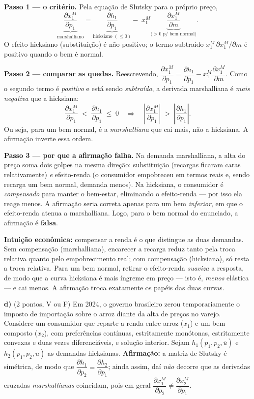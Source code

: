 \begin{solucao}
\textbf{Passo 1 --- o critério.} Pela equação de Slutsky para o próprio preço,
\[
\underbrace{\frac{\partial x_1^{M}}{\partial p_1}}_{\text{marshalliano}}=\underbrace{\frac{\partial h_1}{\partial p_1}}_{\text{hicksiano }(\le 0)}-\;x_1^{M}\underbrace{\frac{\partial x_1^{M}}{\partial m}}_{\text{(}>0\text{ p/ bem normal)}}.
\]
O efeito hicksiano (substituição) é não-positivo; o termo subtraído $x_1^{M}\,\partial x_1^{M}/\partial m$ é positivo quando o bem é normal.

\textbf{Passo 2 --- comparar as quedas.} Reescrevendo, $\dfrac{\partial x_1^{M}}{\partial p_1}=\dfrac{\partial h_1}{\partial p_1}-x_1^{M}\dfrac{\partial x_1^{M}}{\partial m}$. Como o segundo termo é \emph{positivo} e está sendo \emph{subtraído}, a derivada marshalliana é \emph{mais negativa} que a hicksiana:
\[
\frac{\partial x_1^{M}}{\partial p_1}\;<\;\frac{\partial h_1}{\partial p_1}\;\le\;0\quad\Longrightarrow\quad \left|\frac{\partial x_1^{M}}{\partial p_1}\right|\;>\;\left|\frac{\partial h_1}{\partial p_1}\right|.
\]
Ou seja, para um bem normal, é a \emph{marshalliana} que cai mais, não a hicksiana. A afirmação inverte essa ordem.

\textbf{Passo 3 --- por que a afirmação falha.} Na demanda marshalliana, a alta do preço soma dois golpes na mesma direção: substituição (recargas ficaram caras relativamente) \emph{e} efeito-renda (o consumidor empobreceu em termos reais e, sendo recarga um bem normal, demanda menos). Na hicksiana, o consumidor é \emph{compensado} para manter o bem-estar, eliminando o efeito-renda --- por isso ela reage menos. A afirmação seria correta apenas para um bem \emph{inferior}, em que o efeito-renda atenua a marshalliana. Logo, para o bem normal do enunciado, a afirmação é \textbf{falsa}.

\textbf{Intuição econômica:} compensar a renda é o que distingue as duas demandas. Sem compensação (marshalliana), encarecer a recarga reduz tanto pela troca relativa quanto pelo empobrecimento real; com compensação (hicksiana), só resta a troca relativa. Para um bem normal, retirar o efeito-renda \emph{suaviza} a resposta, de modo que a curva hicksiana é mais íngreme em preço --- isto é, \emph{menos} elástica --- e cai menos. A afirmação troca exatamente os papéis das duas curvas.
\end{solucao}

\textbf{d)} (2 pontos, V ou F) Em 2024, o governo brasileiro zerou temporariamente o imposto de importação sobre o arroz diante da alta de preços no varejo. Considere um consumidor que reparte a renda entre arroz ($x_1$) e um bem composto ($x_2$), com preferências contínuas, estritamente monótonas, estritamente convexas e duas vezes diferenciáveis, e solução interior. Sejam $h_1(p_1,p_2,\bar u)$ e $h_2(p_1,p_2,\bar u)$ as demandas hicksianas. \textbf{Afirmação:} a matriz de Slutsky é simétrica, de modo que $\dfrac{\partial h_1}{\partial p_2}=\dfrac{\partial h_2}{\partial p_1}$; ainda assim, daí \emph{não} decorre que as derivadas cruzadas \emph{marshallianas} coincidam, pois em geral $\dfrac{\partial x_1^{M}}{\partial p_2}\neq\dfrac{\partial x_2^{M}}{\partial p_1}$.

